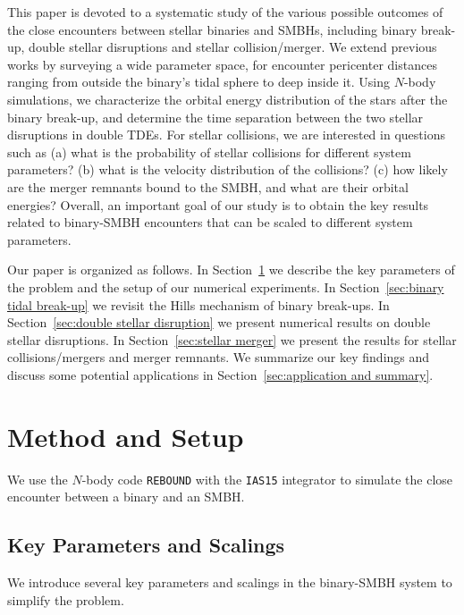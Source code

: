 \documentclass[twocolumn]{aastex631}
\begin{document}
This paper is devoted to a systematic study of the various possible outcomes of the close encounters between stellar binaries and SMBHs,
including binary break-up, double stellar disruptions and stellar collision/merger. 
We extend previous works by surveying a wide parameter space, 
for encounter pericenter distances ranging from outside the binary's tidal sphere to deep inside it.
Using $N$-body simulations, we characterize the orbital energy distribution of the stars after the binary break-up, and determine the time separation between the two stellar disruptions in double TDEs. 
For stellar collisions, we are interested in questions such as
(a) what is the probability of stellar collisions for different system parameters?
(b) what is the velocity distribution of the collisions?
(c) how likely are the merger remnants bound to the SMBH, and what are their orbital energies?
Overall, an important goal of our study is to obtain the key results related to binary-SMBH encounters that can be scaled to different system parameters. 

Our paper is organized as follows. 
In Section~\ref{sec:method and setup} we describe the key parameters of the problem and the setup of our numerical experiments. 
In Section~\ref{sec:binary tidal break-up} we revisit the Hills mechanism of binary break-ups. 
In Section~\ref{sec:double stellar disruption} we present numerical results on double stellar disruptions.
In Section~\ref{sec:stellar merger} we present the results for stellar collisions/mergers and merger remnants.
We summarize our key findings and discuss some potential applications in Section~\ref{sec:application and summary}. 


\section{Method and Setup}
\label{sec:method and setup}

We use the $N$-body code \texttt{REBOUND} with the \texttt{IAS15} integrator \citep{rebound,reboundias15} to simulate the close encounter between a binary and an SMBH.


\subsection{Key Parameters and Scalings}
\label{sec:key parameters}

We introduce several key parameters and scalings in the binary-SMBH system to simplify the problem. 
\end{document}
